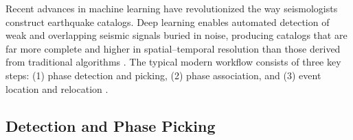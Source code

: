 \documentclass[review]{seismica}
\begin{document}
Recent advances in machine learning have revolutionized the way
seismologists construct earthquake catalogs. Deep learning enables
automated detection of weak and overlapping seismic signals buried in
noise, producing catalogs that are far more complete and higher in
spatial--temporal resolution than those derived from traditional
algorithms \citep{poggiali2025fault, mousavi2023machine}. The typical
modern workflow consists of three key steps: (1) phase detection and
picking, (2) phase association, and (3) event location and relocation
\citep[e.g.,][]{zhu2022endtoend, zhu2023quakeflow, Isken25, Shiddiqi25}.

\subsection{Detection and Phase
Picking}\label{detection-and-phase-picking}
\end{document}

